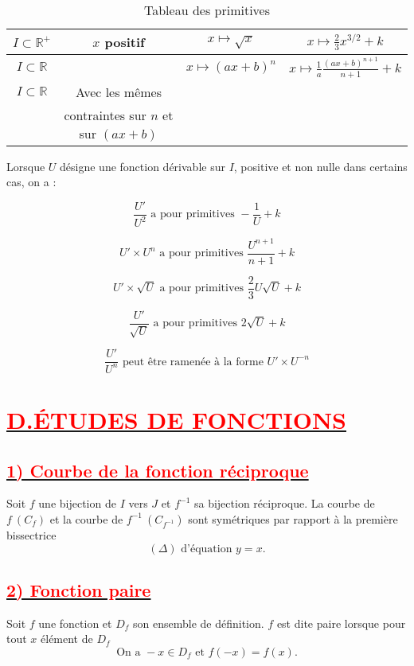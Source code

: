 \documentclass[12pt]{article}
\begin{document}
\begin{table}[h!]
\begin{tabular}{|c|c|c|c|}
        \hline
        \( I \subset \mathbb{R}^+ \) & \( x \) positif & \( x \mapsto \sqrt{x} \) & \( x \mapsto \frac{2}{3} x^{3/2} + k \) \\
        \hline
        \( I \subset \mathbb{R} \) & & \( x \mapsto (ax+b)^n \) & \( x \mapsto \frac{1}{a} \frac{(ax+b)^{n+1}}{n+1} + k \) \\
        \hline
        \( I \subset \mathbb{R} \) & Avec les mêmes & & \\
        & contraintes sur \( n \) et sur \( (ax+b) \) & & \\
        \hline
    \end{tabular}
    \caption{Tableau des primitives}
\end{table}

Lorsque $U$ désigne une fonction dérivable sur $I$, positive et non nulle dans certains cas, on a :

\[
\frac{U'}{U^2} \text{ a pour primitives } -\frac{1}{U} + k
\]

\[
U' \times U^n \text{ a pour primitives } \frac{U^{n+1}}{n+1} + k
\]

\[
U' \times \sqrt{U} \text{ a pour primitives } \frac{2}{3} U \sqrt{U} + k
\]

\[
\frac{U'}{\sqrt{U}} \text{ a pour primitives } 2 \sqrt{U} + k
\]

\[
\frac{U'}{U^n} \text{ peut être ramenée à la forme } U' \times U^{-n}
\]

\section*{\underline{\textbf{\textcolor{red}{D.ÉTUDES DE FONCTIONS}}}}
\subsection*{\underline{\textbf{\textcolor{red}{1) Courbe de la fonction réciproque}}}}

Soit $f$ une bijection de $I$ vers $J$ et $f^{-1}$ sa bijection réciproque.  
La courbe de $f \ (C_f)$ et la courbe de $f^{-1} \ (C_{f^{-1}})$ sont symétriques par rapport à la première bissectrice  
\[
(\Delta) \text{ d'équation } y = x.
\]
\subsection*{\underline{\textbf{\textcolor{red}{2) Fonction paire}}}}

Soit $f$ une fonction et $D_f$ son ensemble de définition. $f$ est dite paire lorsque pour tout $x$ élément de $D_f$  
\[
\text{On a } -x \in D_f \text{ et } f(-x) = f(x).
\]
\end{document}
